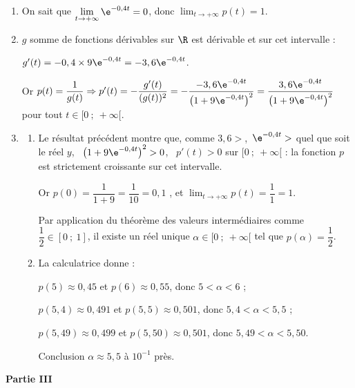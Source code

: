 \begin{enumerate}
\item 
On sait que $\displaystyle\lim_{t \to + \infty} \e^{-0,4t} = 0$, donc $\displaystyle\lim_{t \to + \infty} p(t) = 1$. 
\item 
$g$ somme de fonctions dérivables sur $\R$ est dérivable et sur cet intervalle :

$g'(t) = - 0,4 \times 9\e^{-0,4t} = - 3,6\e^{-0,4t}$.

Or $p(t) = \dfrac{1}{g(t)} \Rightarrow p'(t) = - \dfrac{g'(t)}{(g(t))^2} = - \dfrac{- 3,6\e^{-0,4t}}{\left(1 + 9\e^{-0,4t} \right)^2} = \dfrac{3,6\e^{-0,4t}}{\left(1 + 9\e^{-0,4t} \right)^2}$  pour tout $t \in  [0~;~+ \infty[$.
\item  
	\begin{enumerate}
		\item 
Le résultat précédent montre que, comme $3,6 > $,\, $\e^{-0,4t} > $ quel que soit le réel $y$, \, $\left(1 + 9\e^{-0,4t} \right)^2 > 0$, \, $p'(t) > 0$ sur $[0~;~+ \infty[$ : la fonction $p$ est strictement croissante sur cet intervalle.

Or $p(0) = \dfrac{1}{1 + 9} = \dfrac{1}{10} = 0,1$ ,  et $\displaystyle\lim_{t \to + \infty} p(t) = \dfrac{1}{1} = 1$.

Par application du théorème des valeurs intermédiaires comme $\dfrac{1}{2} \in [0~;~1]$, il existe un réel unique $\alpha \in [0~;~+ \infty[$ tel que $p(\alpha) = \dfrac{1}{2}$.
		\item 
La calculatrice donne :

$p(5) \approx 0,45$ et $p(6) \approx 0,55$, donc $5 < \alpha < 6$ ;

$p(5,4) \approx 0,491$ et $p(5,5) \approx 0,501$, donc $5,4 < \alpha < 5,5$ ;

$p(5,49) \approx 0,499$ et $p(5,50) \approx 0,501$, donc $5,49 < \alpha < 5,50$.

Conclusion $\alpha \approx 5,5$ à $10^{-1}$ près.
	\end{enumerate}
\end{enumerate}

\bigskip

\textbf{Partie III}

\medskip

